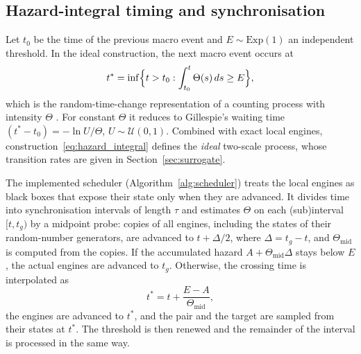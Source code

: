 \documentclass[a4paper,fleqn]{cas-sc}
\newcommand{\Exp}{\mathrm{Exp}}
\begin{document}
\subsection{Hazard-integral timing and synchronisation}
\label{sec:timing}

Let $t_0$ be the time of the previous macro event and $E\sim\Exp(1)$ an independent threshold. In the ideal construction, the next macro event occurs at
\begin{equation}
\label{eq:hazard_integral}
t^\ast=\inf\Bigl\{t>t_0:\int_{t_0}^{t}\Theta(s)\,ds\ge E\Bigr\},
\end{equation}
which is the random-time-change representation of a counting process with intensity $\Theta$ \citep{ethier1986,anderson2007}. For constant $\Theta$ it reduces to Gillespie's waiting time $(t^\ast-t_0)=-\ln U/\Theta$, $U\sim\mathcal{U}(0,1)$. Combined with exact local engines, construction~\eqref{eq:hazard_integral} defines the \emph{ideal} two-scale process, whose transition rates are given in Section~\ref{sec:surrogate}.

The implemented scheduler (Algorithm~\ref{alg:scheduler}) treats the local engines as black boxes that expose their state only when they are advanced. It divides time into synchronisation intervals of length $\tau$ and estimates $\Theta$ on each (sub)interval $[t,t_g)$ by a midpoint probe: copies of all engines, including the states of their random-number generators, are advanced to $t+\Delta/2$, where $\Delta=t_g-t$, and $\Theta_{\mathrm{mid}}$ is computed from the copies. If the accumulated hazard $A+\Theta_{\mathrm{mid}}\Delta$ stays below $E$, the actual engines are advanced to $t_g$. Otherwise, the crossing time is interpolated as
\begin{equation}
\label{eq:interpolation}
t^\ast=t+\frac{E-A}{\Theta_{\mathrm{mid}}},
\end{equation}
the engines are advanced to $t^\ast$, and the pair and the target are sampled from their states at $t^\ast$. The threshold is then renewed and the remainder of the interval is processed in the same way.
\end{document}
